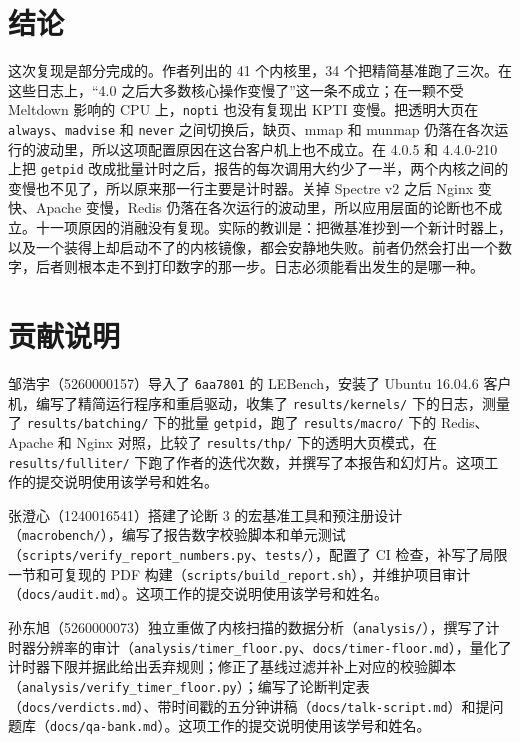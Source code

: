 \documentclass[11pt,fontset=none]{ctexart}
\begin{document}
\section{结论}

这次复现是部分完成的。作者列出的 41 个内核里，34 个把精简基准跑了三次。在这些日志上，“4.0 之后大多数核心操作变慢了”这一条不成立；在一颗不受 Meltdown 影响的 CPU 上，\texttt{nopti} 也没有复现出 KPTI 变慢。把透明大页在 \texttt{always}、\texttt{madvise} 和 \texttt{never} 之间切换后，缺页、mmap 和 munmap 仍落在各次运行的波动里，所以这项配置原因在这台客户机上也不成立。在 4.0.5 和 4.4.0-210 上把 \texttt{getpid} 改成批量计时之后，报告的每次调用大约少了一半，两个内核之间的变慢也不见了，所以原来那一行主要是计时器。关掉 Spectre v2 之后 Nginx 变快、Apache 变慢，Redis 仍落在各次运行的波动里，所以应用层面的论断也不成立。十一项原因的消融没有复现。实际的教训是：把微基准抄到一个新计时器上，以及一个装得上却启动不了的内核镜像，都会安静地失败。前者仍然会打出一个数字，后者则根本走不到打印数字的那一步。日志必须能看出发生的是哪一种。

\section*{贡献说明}

邹浩宇（5260000157）导入了 \texttt{6aa7801} 的 LEBench，安装了 Ubuntu 16.04.6 客户机，编写了精简运行程序和重启驱动，收集了 \texttt{results/kernels/} 下的日志，测量了 \texttt{results/batching/} 下的批量 \texttt{getpid}，跑了 \texttt{results/macro/} 下的 Redis、Apache 和 Nginx 对照，比较了 \texttt{results/thp/} 下的透明大页模式，在 \texttt{results/fulliter/} 下跑了作者的迭代次数，并撰写了本报告和幻灯片。这项工作的提交说明使用该学号和姓名。

张澄心（1240016541）搭建了论断 3 的宏基准工具和预注册设计（\texttt{macrobench/}），编写了报告数字校验脚本和单元测试（\texttt{scripts/verify\_report\_numbers.py}、\texttt{tests/}），配置了 CI 检查，补写了局限一节和可复现的 PDF 构建（\texttt{scripts/build\_report.sh}），并维护项目审计（\texttt{docs/audit.md}）。这项工作的提交说明使用该学号和姓名。

孙东旭（5260000073）独立重做了内核扫描的数据分析（\texttt{analysis/}），撰写了计时器分辨率的审计（\texttt{analysis/timer\_floor.py}、\texttt{docs/timer-floor.md}），量化了计时器下限并据此给出丢弃规则；修正了基线过滤并补上对应的校验脚本（\texttt{analysis/verify\_timer\_floor.py}）；编写了论断判定表（\texttt{docs/verdicts.md}）、带时间戳的五分钟讲稿（\texttt{docs/talk-script.md}）和提问题库（\texttt{docs/qa-bank.md}）。这项工作的提交说明使用该学号和姓名。
\end{document}
